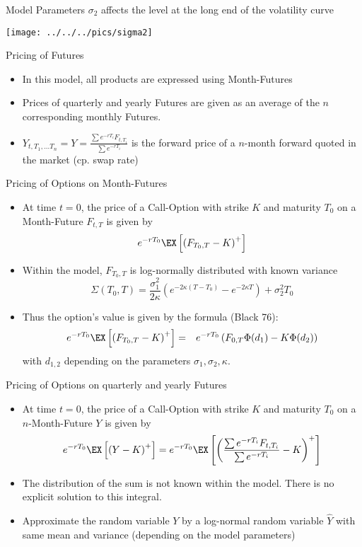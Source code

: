{Model Parameters}
$\sigma_2$ affects the level at the long end of the volatility curve

\begin{center}
\texttt{[image: ../../../pics/sigma2]}
\end{center}




{Pricing of Futures}
\begin{itemize}
\item<1-> In this model, all products are expressed using Month-Futures
\item<2-> Prices of quarterly and yearly Futures are given as an
average of the  $n$ corresponding monthly Futures.
\item<3-> $Y_{t,T_1, \ldots T_n}=Y=\frac{\sum e^{-rT_i}F_{t,T_i}}{\sum e^{-rT_i}}$
is the forward price of a $n$-month forward quoted in the market (cp. swap rate)
\end{itemize}


{Pricing of Options on Month-Futures}
\begin{itemize}
\item<1-> At time $t=0$, the price of a  Call-Option with strike $K$ and maturity $T_0$ on a Month-Future $F_{t,T}$ is given by
$$e^{-rT_0}\EX\left[\left(F_{T_0,T}-K\right)^+\right]$$
\item<2-> Within the model,  $F_{T_0,T}$ is log-normally distributed with known variance
$$
\Sigma(T_0,T) =   \frac{\sigma_1^2}{2\kappa}(e^{-2\kappa (T-T_0)}-e^{-2\kappa T})+\sigma_2^2T_0
$$
\item<3-> Thus the option's value is given by the formula (Black 76):
\begin{eqnarray*}
e^{-rT_0}\EX\left[\left(F_{T_0,T}-K\right)^+\right] & = &
e^{-rT_0}\left(F_{0,T}\Phi(d_1)-K\Phi(d_2)\right)
\end{eqnarray*}with $d_{1,2}$ depending on the parameters $\sigma_1, \sigma_2, \kappa$.
\end{itemize}


{Pricing of Options on quarterly and yearly Futures}
\begin{itemize}
\item<1-> At time $t=0$, the price of a  Call-Option with strike $K$ and maturity $T_0$ on a $n$-Month-Future
$Y$ is given by
$$
e^{-rT_0}\EX\left[\left(Y-K\right)^+\right]=e^{-rT_0}\EX
\left[\left(\frac{\sum e^{-rT_i}F_{t,T_i}}{\sum e^{-rT_i}}-K\right)^+\right]$$
\item<2-> The distribution of the sum is not known within the model. There is no explicit solution to this integral.
\item<3-> Approximate the random variable $Y$ by a log-normal random variable $\hat{Y}$
with same mean and variance (depending on the model parameters)
\end{itemize}


